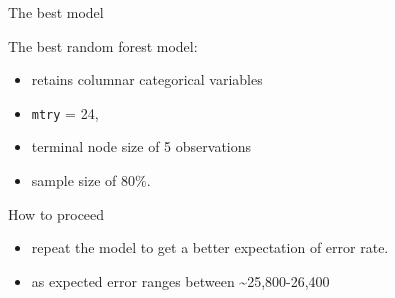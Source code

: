 \documentclass[
  10pt,
  ignorenonframetext,
]{beamer}
\providecommand{\tightlist}{%
  \setlength{\itemsep}{0pt}\setlength{\parskip}{0pt}}
\begin{document}
\begin{frame}[fragile]{The best model}
\protect\hypertarget{the-best-model}{}

\begin{block}{The best random forest model:}

\begin{itemize}
\tightlist
\item
  retains columnar categorical variables
\item
  \texttt{mtry} = 24,
\item
  terminal node size of 5 observations
\item
  sample size of 80\%.
\end{itemize}

\end{block}

\begin{block}{How to proceed}

\begin{itemize}
\tightlist
\item
  repeat the model to get a better expectation of error rate.
\item
  as expected error ranges between \textasciitilde{}25,800-26,400
\end{itemize}

\end{block}

\end{frame}
\end{document}
